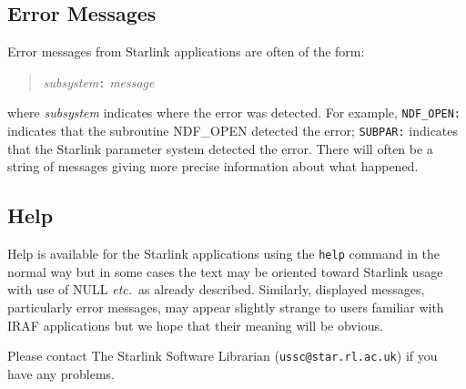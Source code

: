 \documentclass[twoside,11pt]{article}
\newcommand{\htmlref}[2]{#1}
\newcommand{\xlabel}[1]{}
\begin{document}
\subsection{\xlabel{error_messages}\label{error_messages}Error Messages}
Error messages from Starlink applications are often of the form:
\begin{quote}
\textit{subsystem}\texttt{:} \textit{message}
\end{quote}
where \textit{subsystem}
indicates where the error was detected. For example, \texttt{NDF\_OPEN:}
indicates that the subroutine NDF\_OPEN detected the error; \texttt{SUBPAR:}
indicates that the Starlink parameter system detected the error. There will
often be a string of messages giving more precise information about what
happened.

\subsection{\xlabel{help}Help}
Help is available for the Starlink applications using the \texttt{help} command
in the normal way but in some cases the text may be oriented toward Starlink
usage with use of NULL \textit{etc.}\ as
\htmlref{already described}{indef_and_null}.
Similarly, displayed messages, particularly error messages, may appear slightly
strange to users familiar with IRAF applications but we hope that their meaning
will be obvious.

Please contact The Starlink Software Librarian (\texttt{ussc@star.rl.ac.uk}) if
you have any problems.
\end{document}
